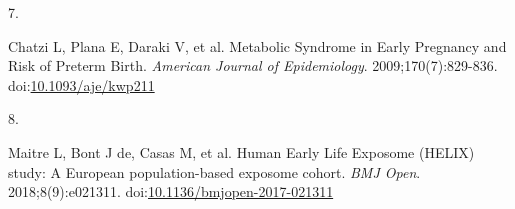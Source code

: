 \documentclass[
  letterpaper,
  DIV=11,
  numbers=noendperiod]{scrartcl}
\newlength{\cslhangindent}
\newlength{\csllabelwidth}
\newenvironment{CSLReferences}[2] %
 {\begin{list}{}{%
  \setlength{\itemindent}{0pt}
  \setlength{\leftmargin}{0pt}
  \setlength{\parsep}{0pt}
  \ifodd #1
   \setlength{\leftmargin}{\cslhangindent}
   \setlength{\itemindent}{-1\cslhangindent}
  \fi
  \setlength{\itemsep}{#2\baselineskip}}}
 {\end{list}}
\newcommand{\CSLLeftMargin}[1]{\parbox[t]{\csllabelwidth}{\strut#1\strut}}
\newcommand{\CSLRightInline}[1]{\parbox[t]{\linewidth - \csllabelwidth}{\strut#1\strut}}
\begin{document}
\begin{CSLReferences}{0}{1}
\CSLLeftMargin{7. }%
\CSLRightInline{Chatzi L, Plana E, Daraki V, et al. Metabolic {Syndrome}
in {Early Pregnancy} and {Risk} of {Preterm Birth}. \emph{American
Journal of Epidemiology}. 2009;170(7):829-836.
doi:\href{https://doi.org/10.1093/aje/kwp211}{10.1093/aje/kwp211}}

\CSLLeftMargin{8. }%
\CSLRightInline{Maitre L, Bont J de, Casas M, et al. Human {Early Life
Exposome} ({HELIX}) study: A {European} population-based exposome
cohort. \emph{BMJ Open}. 2018;8(9):e021311.
doi:\href{https://doi.org/10.1136/bmjopen-2017-021311}{10.1136/bmjopen-2017-021311}}

\end{CSLReferences}
\end{document}
